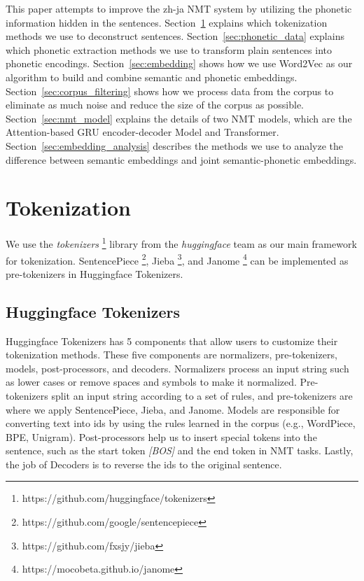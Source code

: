\hspace{24pt}

This paper attempts to improve the zh-ja NMT system by utilizing the phonetic information hidden in the sentences. Section~\ref{sec:tokenization} explains which tokenization methods we use to deconstruct sentences. Section~\ref{sec:phonetic_data} explains which phonetic extraction methods we use to transform plain sentences into phonetic encodings. Section~\ref{sec:embedding} shows how we use Word2Vec as our algorithm to build and combine semantic and phonetic embeddings. Section~\ref{sec:corpus_filtering} shows how we process data from the corpus to eliminate as much noise and reduce the size of the corpus as possible. Section~\ref{sec:nmt_model} explains the details of two NMT models, which are the Attention-based GRU encoder-decoder Model and Transformer. Section~\ref{sec:embedding_analysis} describes the methods we use to analyze the difference between semantic embeddings and joint semantic-phonetic embeddings.

\section{Tokenization} \label{sec:tokenization}

We use the \textit{tokenizers} \footnote{https://github.com/huggingface/tokenizers} library from the \textit{huggingface} team as our main framework for tokenization. SentencePiece \footnote{https://github.com/google/sentencepiece}, Jieba \footnote{https://github.com/fxsjy/jieba}, and Janome \footnote{https://mocobeta.github.io/janome} can be implemented as pre-tokenizers in Huggingface Tokenizers.

\subsection{Huggingface Tokenizers} \label{sec:tokenizers}

Huggingface Tokenizers has 5 components that allow users to customize their tokenization methods. These five components are normalizers, pre-tokenizers, models, post-processors, and decoders. Normalizers process an input string such as lower cases or remove spaces and symbols to make it normalized. Pre-tokenizers split an input string according to a set of rules, and pre-tokenizers are where we apply SentencePiece, Jieba, and Janome. Models are responsible for converting text into ids by using the rules learned in the corpus (e.g., WordPiece, BPE, Unigram). Post-processors help us to insert special tokens into the sentence, such as the start token \textit{[BOS]} and the end token \text{[EOS]} in NMT tasks. Lastly, the job of Decoders is to reverse the ids to the original sentence.

